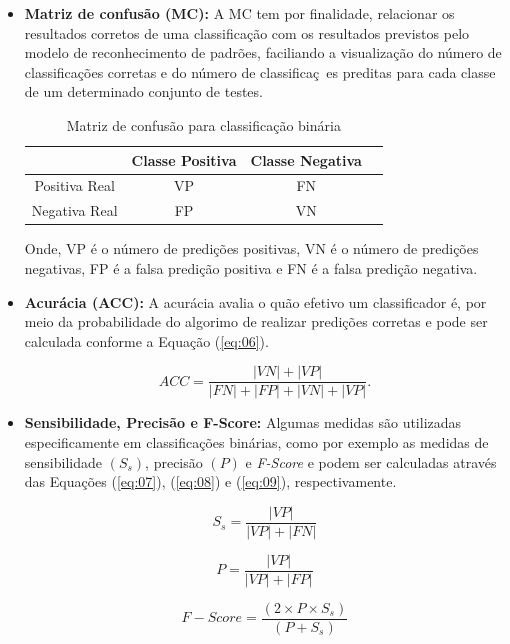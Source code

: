 \documentclass[a4paper]{ifacconf}
\begin{document}
\begin{itemize}
    \item \textbf{Matriz de confusão (MC): }A MC tem por finalidade, relacionar os resultados corretos de uma classificação com os resultados previstos pelo modelo de reconhecimento de padrões, faciliando a visualização do número de classificações corretas e do número de classificaç~es preditas para cada classe de um determinado conjunto de testes.
    
    \begin{table}[hb]
      \begin{center}
        \caption{Matriz de confusão para classificação binária}\label{tb:01}
          \begin{tabular}{cccc}
      & \textbf{Classe Positiva} & \textbf{Classe Negativa} \\\hline
      Positiva Real & VP & FN \\
      Negativa Real & FP & VN \\ \hline
\end{tabular}
\end{center}
\end{table}

Onde, VP é o número de predições positivas, VN é o número de predições negativas, FP é a falsa predição positiva e FN é a falsa predição negativa.   

 \item \textbf{Acurácia (ACC): } A acurácia avalia o quão efetivo um classificador é, por meio da probabilidade do algorimo de realizar predições corretas e pode ser calculada conforme a Equação (\ref{eq:06}).
 
 \begin{equation}\label{eq:06}
	ACC = \frac{|VN|+|VP|}{|FN|+|FP|+|VN|+|VP|}.
\end{equation} 

 \item \textbf{Sensibilidade, Precisão e F-Score: } Algumas medidas são utilizadas especificamente em classificações binárias, como por exemplo as medidas de sensibilidade $(S_s)$, precisão $(P)$ e \textit{F-Score} e podem ser calculadas através das Equações (\ref{eq:07}), (\ref{eq:08}) e (\ref{eq:09}), respectivamente.
 
 \begin{equation}\label{eq:07}
	S_s = \frac{|VP|}{|VP|+|FN|}
\end{equation} 

\begin{equation}\label{eq:08}
	P = \frac{|VP|}{|VP| + |FP|}
\end{equation}

\begin{equation}\label{eq:09}
	F-Score = \frac{(2 \times P \times S_s)}{(P + S_s)}
\end{equation}
 
\end{itemize}
\end{document}
